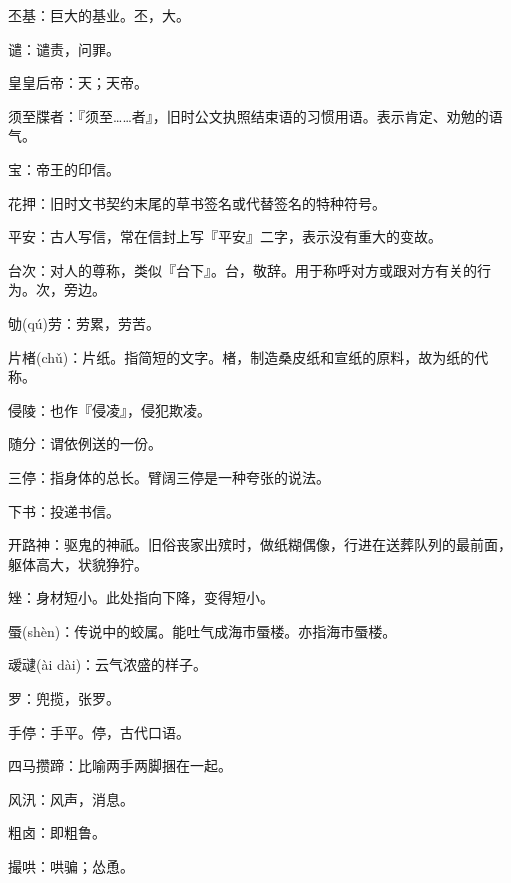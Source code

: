 \startbuffer[1076]
丕基：巨大的基业。丕，大。
\stopbuffer


\startbuffer[1077]
谴：谴责，问罪。
\stopbuffer


\startbuffer[1078]
皇皇后帝：天；天帝。
\stopbuffer


\startbuffer[1079]
须至牒者：『须至……者』，旧时公文执照结束语的习惯用语。表示肯定、劝勉的语气。
\stopbuffer


\startbuffer[1080]
宝：帝王的印信。
\stopbuffer


\startbuffer[1081]
花押：旧时文书契约末尾的草书签名或代替签名的特种符号。
\stopbuffer


\startbuffer[1082]
平安：古人写信，常在信封上写『平安』二字，表示没有重大的变故。
\stopbuffer

\startbuffer[1083]
台次：对人的尊称，类似『台下』。台，敬辞。用于称呼对方或跟对方有关的行为。次，旁边。
\stopbuffer


\startbuffer[1084]
劬(qú)劳：劳累，劳苦。
\stopbuffer


\startbuffer[1085]
片楮(chǔ)：片纸。指简短的文字。楮，制造桑皮纸和宣纸的原料，故为纸的代称。
\stopbuffer


\startbuffer[1086]
侵陵：也作『侵凌』，侵犯欺凌。
\stopbuffer


\startbuffer[1087]
随分：谓依例送的一份。
\stopbuffer


\startbuffer[1088]
三停：指身体的总长。臂阔三停是一种夸张的说法。
\stopbuffer


\startbuffer[1089]
下书：投递书信。
\stopbuffer


\startbuffer[1090]
开路神：驱鬼的神祇。旧俗丧家出殡时，做纸糊偶像，行进在送葬队列的最前面，躯体高大，状貌狰狞。
\stopbuffer


\startbuffer[1091]
矬：身材短小。此处指向下降，变得短小。
\stopbuffer


\startbuffer[1092]
蜃(shèn)：传说中的蛟属。能吐气成海市蜃楼。亦指海市蜃楼。
\stopbuffer


\startbuffer[1093]
叆叇(ài dài)：云气浓盛的样子。
\stopbuffer


\startbuffer[1094]
罗：兜揽，张罗。
\stopbuffer


\startbuffer[1095]
手停：手平。停，古代口语。
\stopbuffer


\startbuffer[1096]
四马攒蹄：比喻两手两脚捆在一起。
\stopbuffer


\startbuffer[1097]
风汛：风声，消息。
\stopbuffer


\startbuffer[1098]
粗卤：即粗鲁。
\stopbuffer


\startbuffer[1099]
撮哄：哄骗；怂恿。
\stopbuffer


